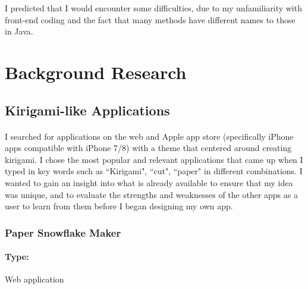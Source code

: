 \documentclass[11pt]{article}
\begin{document}
                    I predicted that I would encounter some difficulties, due to my unfamiliarity with front-end coding and the fact that many methods have different names to those in Java.
                
               
               

\newpage
\section{Background Research}

        \subsection{Kirigami-like Applications}
           \paragraph{}
            I searched for applications on the web and Apple app store (specifically iPhone apps compatible with iPhone 7/8) with a theme that centered around creating kirigami. I chose the most popular and relevant applications that came up when I typed in key words such as ``Kirigami", ``cut", ``paper" in different combinations. I wanted to gain an insight into what is already available to ensure that my idea was unique, and to evaluate the strengths and weaknesses of the other apps as a user to learn from them before I began designing my own app.
            
            \subsubsection{Paper Snowflake Maker}
            
                \paragraph{Type:} Web application \cite{PaperSnowflakeMaker}
\end{document}
